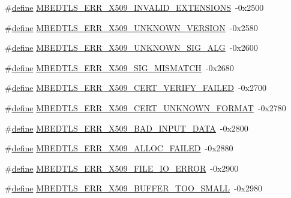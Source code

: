 \begin{DoxyCompactItemize}
\#\hyperlink{structdefine}{define} \hyperlink{group__x509__module_gaa0788dbf0325aea4ab566717514b4422}{M\+B\+E\+D\+T\+L\+S\+\_\+\+E\+R\+R\+\_\+\+X509\+\_\+\+I\+N\+V\+A\+L\+I\+D\+\_\+\+E\+X\+T\+E\+N\+S\+I\+O\+NS}~-\/0x2500
\item 
\#\hyperlink{structdefine}{define} \hyperlink{group__x509__module_gab80a4eb806328731def21ec2ebcbc365}{M\+B\+E\+D\+T\+L\+S\+\_\+\+E\+R\+R\+\_\+\+X509\+\_\+\+U\+N\+K\+N\+O\+W\+N\+\_\+\+V\+E\+R\+S\+I\+ON}~-\/0x2580
\item 
\#\hyperlink{structdefine}{define} \hyperlink{group__x509__module_ga488f8616b42eae6fe3fb9815d43c976f}{M\+B\+E\+D\+T\+L\+S\+\_\+\+E\+R\+R\+\_\+\+X509\+\_\+\+U\+N\+K\+N\+O\+W\+N\+\_\+\+S\+I\+G\+\_\+\+A\+LG}~-\/0x2600
\item 
\#\hyperlink{structdefine}{define} \hyperlink{group__x509__module_gac489ce5e8ba417bcd86012ebbb7f5044}{M\+B\+E\+D\+T\+L\+S\+\_\+\+E\+R\+R\+\_\+\+X509\+\_\+\+S\+I\+G\+\_\+\+M\+I\+S\+M\+A\+T\+CH}~-\/0x2680
\item 
\#\hyperlink{structdefine}{define} \hyperlink{group__x509__module_gaba46df0041dcf48fa9d164d28cf3a154}{M\+B\+E\+D\+T\+L\+S\+\_\+\+E\+R\+R\+\_\+\+X509\+\_\+\+C\+E\+R\+T\+\_\+\+V\+E\+R\+I\+F\+Y\+\_\+\+F\+A\+I\+L\+ED}~-\/0x2700
\item 
\#\hyperlink{structdefine}{define} \hyperlink{group__x509__module_gaeb90af9ad906c5075b1ad625ebc26553}{M\+B\+E\+D\+T\+L\+S\+\_\+\+E\+R\+R\+\_\+\+X509\+\_\+\+C\+E\+R\+T\+\_\+\+U\+N\+K\+N\+O\+W\+N\+\_\+\+F\+O\+R\+M\+AT}~-\/0x2780
\item 
\#\hyperlink{structdefine}{define} \hyperlink{group__x509__module_gaeeef11ebf0b31a54a665b1a3fd65c3f7}{M\+B\+E\+D\+T\+L\+S\+\_\+\+E\+R\+R\+\_\+\+X509\+\_\+\+B\+A\+D\+\_\+\+I\+N\+P\+U\+T\+\_\+\+D\+A\+TA}~-\/0x2800
\item 
\#\hyperlink{structdefine}{define} \hyperlink{group__x509__module_gacf6d98c6cbb76728260d1dcb1fe3bc7d}{M\+B\+E\+D\+T\+L\+S\+\_\+\+E\+R\+R\+\_\+\+X509\+\_\+\+A\+L\+L\+O\+C\+\_\+\+F\+A\+I\+L\+ED}~-\/0x2880
\item 
\#\hyperlink{structdefine}{define} \hyperlink{group__x509__module_gad85d9c7aa5c30b9730297bef3386407c}{M\+B\+E\+D\+T\+L\+S\+\_\+\+E\+R\+R\+\_\+\+X509\+\_\+\+F\+I\+L\+E\+\_\+\+I\+O\+\_\+\+E\+R\+R\+OR}~-\/0x2900
\item 
\#\hyperlink{structdefine}{define} \hyperlink{group__x509__module_gab9516fc53ff90c547fd77d35c71feec7}{M\+B\+E\+D\+T\+L\+S\+\_\+\+E\+R\+R\+\_\+\+X509\+\_\+\+B\+U\+F\+F\+E\+R\+\_\+\+T\+O\+O\+\_\+\+S\+M\+A\+LL}~-\/0x2980
\end{DoxyCompactItemize}
